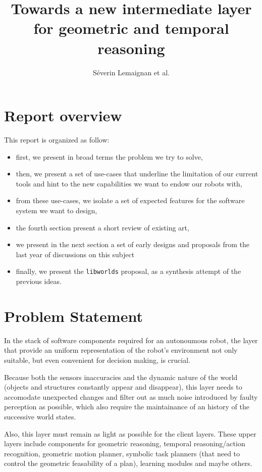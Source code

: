 \documentclass[a4paper]{article}
\title{Towards a new intermediate layer for geometric and temporal reasoning}
\author{Séverin Lemaignan et al.}
\date{}
\begin{document}
\maketitle


\section*{Report overview}

This report is organized as follow:

\begin{itemize}
    \item first, we present in broad terms the problem we try to solve,
    \item  then, we present a set of use-cases that underline the limitation of our current tools and hint to the new capabilities we want to endow our robots with,
    \item from these use-cases, we isolate a set of expected features for the software system we want to design,
    \item the fourth section present a short review of existing art,
    \item we present in the next section a set of early designs and proposals from the last year of discussions on this subject
    \item finally, we present the {\tt libworlds} proposal, as a synthesis attempt of the previous ideas.
\end{itemize}

\clearpage

\section{Problem Statement}
\label{problem-statement}%

In the stack of software components required for an autonoumous robot, the
layer that provide an uniform representation of the robot's environment not
only suitable, but even convenient for decision making, is crucial.

Because both the sensors inaccuracies and the dynamic nature of the world
(objects and structures constantly appear and disappear), this layer needs to
accomodate unexpected changes and filter out as much noise introduced by faulty
perception as possible, which also require the maintainance of an history of
the successive world states.

Also, this layer must remain as light as possible for the client layers.
These upper layers include components for geometric reasoning, temporal
reasoning/action recognition, geometric motion planner, symbolic task planners
(that need to control the geometric feasability of a plan), learning modules
and maybe others.
\end{document}
